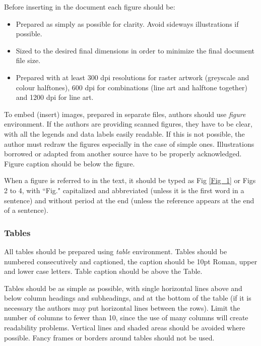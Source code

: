 \documentclass{ECOS_2021}
\begin{document}
Before inserting in the document each figure should be:

\begin{itemize}
    \item Prepared as simply as possible for clarity. Avoid sideways illustrations if possible.
    \item Sized to the desired final dimensions in order to minimize the final document file size.
    \item Prepared with at least 300 dpi resolutions for raster artwork (greyscale and colour halftones), 600 dpi for combinations (line art and halftone together) and 1200 dpi for line art.
\end{itemize}

To embed (insert) images, prepared in separate files, authors should use \textit{figure} environment. If the authors are providing scanned figures, they have to be clear, with all the legends and data labels easily readable. If this is not possible, the author must redraw the figures especially in the case of simple ones. Illustrations borrowed or adapted from another source have to be properly acknowledged. Figure caption should be below the figure.

When a figure is referred to in the text, it should be typed as Fig \ref{Fig_1} or Figs 2 to 4, with ``Fig." capitalized and abbreviated (unless it is the first word in a sentence) and without period at the end (unless the reference appears at the end of a sentence).

\sffamily \subsubsection{Tables} \label{Tables}
\rmfamily
All tables should be prepared using \textit{table} environment. Tables should be numbered consecutively and captioned, the caption should be 10pt Roman, upper and lower case letters. Table caption should be above the Table.

Tables should be as simple as possible, with single horizontal lines above and below column headings and subheadings, and at the bottom of the table (if it is necessary the authors may put horizontal lines between the rows). Limit the number of columns to fewer than 10, since the use of many columns will create readability problems. Vertical lines and shaded areas should be avoided where possible. Fancy frames or borders around tables should not be used.
\end{document}
